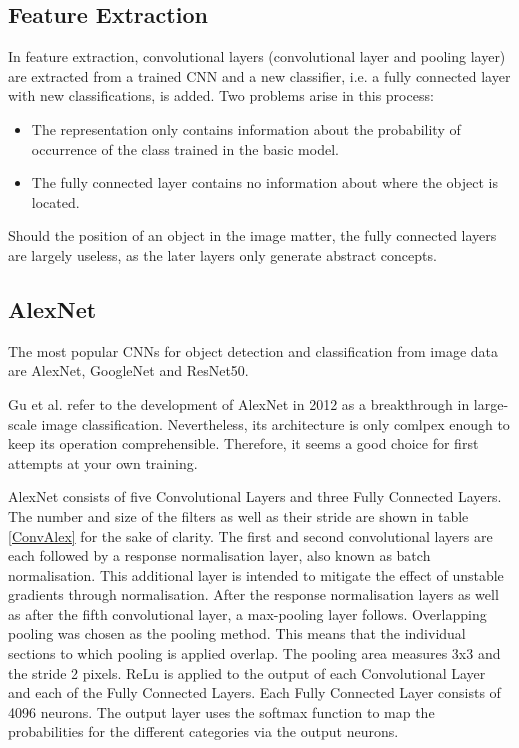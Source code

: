 \subsection{Feature Extraction}

In feature extraction, convolutional layers (convolutional layer and pooling layer) are extracted from a trained CNN and a new classifier, i.e. a fully connected layer with new classifications, is added. Two problems arise in this process:

\begin{itemize}
	\item The representation only contains information about the probability of occurrence of the class trained in the basic model.
	\item The fully connected layer contains no information about where the object is located.
\end{itemize}

Should the position of an object in the image matter, the fully connected layers are largely useless, as the later layers only generate abstract concepts. \cite{Chollet:2018}

\subsection{AlexNet}
The most popular CNNs for object detection and classification from image data are AlexNet, GoogleNet and ResNet50. \cite{Sharma:2018}

Gu et al. \cite{Gu:2018} refer to the development of AlexNet in 2012 as a breakthrough in large-scale image classification. Nevertheless, its architecture is only comlpex enough to keep its operation comprehensible. Therefore, it seems a good choice for first attempts at your own training.


AlexNet consists of five Convolutional Layers and three Fully Connected Layers. The number and size of the filters as well as their stride are shown in table \ref{ConvAlex} for the sake of clarity. The first and second convolutional layers are each followed by a response normalisation layer, also known as batch normalisation. This additional layer is intended to mitigate the effect of unstable gradients through normalisation. After the response normalisation layers as well as after the fifth convolutional layer, a max-pooling layer follows. Overlapping pooling was chosen as the pooling method. This means that the individual sections to which pooling is applied overlap. The pooling area measures 3x3 and the stride 2 pixels. ReLu is applied to the output of each Convolutional Layer and each of the Fully Connected Layers. Each Fully Connected Layer consists of 4096 neurons. The output layer uses the softmax function to map the probabilities for the different categories via the output neurons. \cite{Krizhevsky:2012,Alake:2020}



